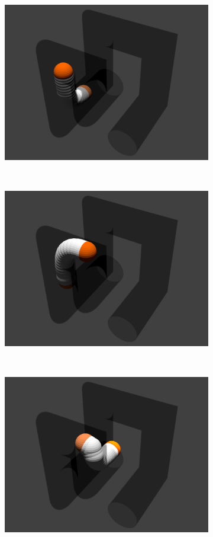 \documentclass[12pt,a4]{article}
\begin{document}
\begin{figure}[ht!]
\begin{subfigure}{0.31\textwidth}
    \end{subfigure}%
    \\~\\
    
       \begin{subfigure}{0.31\textwidth}
        \centering
        \includegraphics[width=0.8\linewidth]{figures/Pipesnaps/4.png}
       
    \end{subfigure}%
    ~
        \begin{subfigure}{0.31\textwidth}
        \centering
        \includegraphics[width=0.8\linewidth]{figures/Pipesnaps/5.png}
      
    \end{subfigure}%
    ~
        \begin{subfigure}{0.31\textwidth}
        \centering
        \includegraphics[width=0.8\linewidth]{figures/Pipesnaps/6.png}
        

\end{subfigure}
\end{figure}
\end{document}
